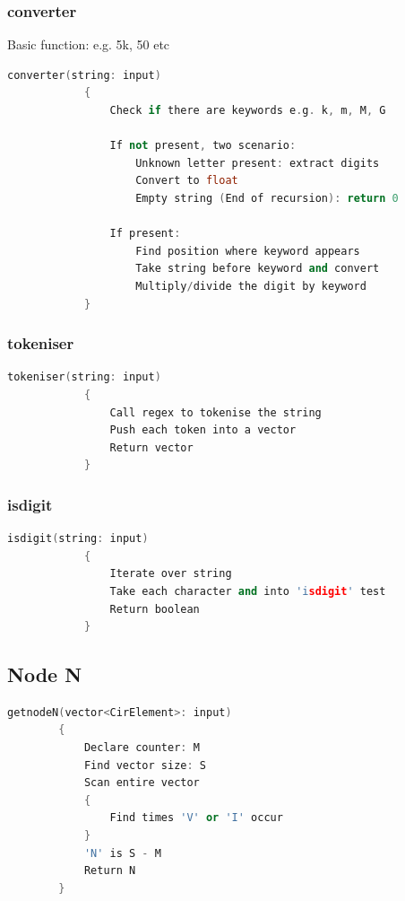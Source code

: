 \documentclass[a4paper, titlepage]{article}
\begin{document}
    \subsubsection{converter}
    Basic function: e.g. 5k, 50 etc
    \begin{lstlisting}[language=C++]
        converter(string: input)
            {
                Check if there are keywords e.g. k, m, M, G
    
                If not present, two scenario:
                    Unknown letter present: extract digits 
                    Convert to float
                    Empty string (End of recursion): return 0
    
                If present:
                    Find position where keyword appears
                    Take string before keyword and convert
                    Multiply/divide the digit by keyword
            }
    \end{lstlisting}

    \subsubsection{tokeniser}
    \begin{lstlisting}[language=C++]
        tokeniser(string: input)
            {
                Call regex to tokenise the string 
                Push each token into a vector 
                Return vector
            }
    \end{lstlisting}

    \subsubsection{isdigit}
    \begin{lstlisting}[language=C++]
        isdigit(string: input)
            {
                Iterate over string
                Take each character and into 'isdigit' test
                Return boolean
            }
    \end{lstlisting}
    \subsection{Node N}
    \begin{lstlisting}[language=C++]
        getnodeN(vector<CirElement>: input)
        {
            Declare counter: M
            Find vector size: S
            Scan entire vector
            {
                Find times 'V' or 'I' occur
            }
            'N' is S - M
            Return N
        }
    \end{lstlisting}
\end{document}
